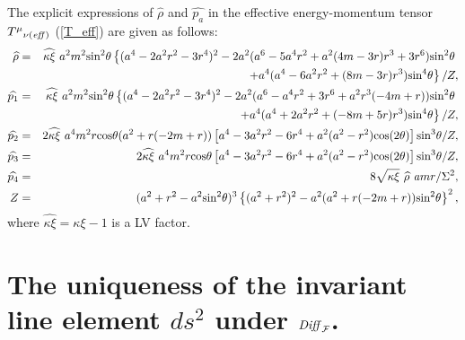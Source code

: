 \documentclass[preprint,aps,tightenlines,showkeys,nofootinbib,superscriptaddress]{revtex4}
\newcommand{\beq}{\begin{eqnarray}}
\newcommand{\eeq}{\end{eqnarray}}
\newcommand{\m}{{\mu}}
\newcommand{\n}{{\nu}}
\newcommand{\Si}{{\Sigma}}
\newcommand{\no}{{\nonumber}}
\begin{document}
The explicit expressions of $\widehat{\rho}$ and $\widehat{p_a}$ in
the effective energy-momentum tensor ${T^{\m}}_{\n (\it{eff})}$ (\ref{T_eff}) are given as follows:
\beq
\widehat{\rho} &=& \widehat{\kappa\xi}~
a^2 m^2  \text{sin}^2\theta
 \left\{
(a^4-2 a^2 r^2-3 r^4)^2-2 a^2 (a^6-5 a^4 r^2+a^2 (4 m-3 r)
r^3+3 r^6) \text{sin}^2\theta
\right.  \no \\
&&\left.
+a^4 (a^4-6 a^2 r^2+(8 m-3 r) r^3) \text{sin}^4\theta
 \right\}/Z, \\
\widehat{p_1} &=& \widehat{\kappa\xi} ~
a^2 m^2  \text{sin}^2\theta \left\{(a^4-2 a^2 r^2-3 r^4)^2-2 a^2 (a^6-a^4 r^2+3 r^6+a^2 r^3 (-4
m+r)) \text{sin}^2\theta
\right.  \no \\
&&\left.
+a^4 (a^4+2 a^2 r^2+(-8 m+5 r)r^3 ) \text{sin}^4\theta\right\}/Z ,\\
\widehat{p_2} &=&2 \widehat{\kappa\xi} ~
a^4 m^2 r \text{cos}\theta (a^2+r (-2 m+r)) \left[a^4-3 a^2 r^2-6 r^4+a^2 (a^2-r^2) \text{cos}(2 \theta)\right] \text{sin}^3\theta/Z, \\
\widehat{p_3} &=&2 \widehat{\kappa\xi}~a^4 m^2 r
\text{cos}\theta \left[a^4-3 a^2 r^2-6 r^4+a^2 (a^2-r^2) \text{cos}(2 \theta )\right]
\text{sin}^3\theta/Z, \\
\widehat{p_4} &=&8 \sqrt{\kappa \xi} ~\widehat{\rho}~ {\it a} m r/\Si^2 ,\\
Z&=&(a^2+r^2-a^2 \text{sin}^2\theta)^3 \left\{(a^2+r^2)^2-a^2 (a^2+r (-2 m+r)) \text{sin}^2\theta\right\}^2,
\eeq
where $\widehat{\kappa\xi} =\kappa  \xi-1$ is a LV
factor.

\section{The uniqueness of the invariant line element $ds^2$ under ${\it Diff}_{\cal F}$.}
\end{document}
